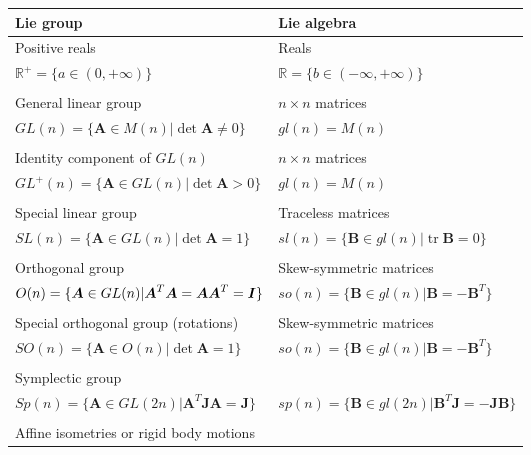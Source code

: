 \documentclass[12pt]{article}
\newcommand{\mbs}[1]{\boldsymbol{#1}}
\newcommand{\mbb}[1]{\mathbb{#1}}
\def\bA{{\mbs{A}}} \def\bB{{\mbs{B}}} \def\bC{{\mbs{C}}}
\def\bJ{{\mbs{J}}} \def\bK{{\mbs{K}}} \def\bL{{\mbs{L}}}
\DeclareMathOperator{\tr}{tr}
\begin{document}
\begin{table}[htbp]
  \begin{center}
    \begin{tabular}{ l l }
      \toprule
      Lie group
      &
      Lie algebra
      \\
      \hline
      Positive reals
      &
      Reals
      \\
      $\mbb{R}^+ = \{ a \in (0,+\infty) \}$
      &
      $\mbb{R} = \{ b \in (-\infty, +\infty) \}$
      \\
      \\
      General linear group
      &
      $n\times n$ matrices
      \\
      $GL(n)=\{\bA\in M(n) | \det \bA \neq 0\}$
      &
      $gl(n)=M(n)$
      \\
      \\
      Identity component of $GL(n)$
      &
      $n\times n$ matrices
      \\
      $GL^+(n)=\{\bA\in GL(n) | \det \bA > 0\}$
      &
      $gl(n)=M(n)$
      \\
      \\
      Special linear group
      &
      Traceless matrices
      \\
      $SL(n)=\{\bA\in GL(n) | \det \bA = 1\}$
      &
      $sl(n)=\{\bB\in gl(n) | \tr \bB = 0\}$
      \\
      \\
      Orthogonal group
      &
      Skew-symmetric matrices
      \\
      $O(n)=\{\bA\in GL(n) | \bA^T\bA = \bA\bA^T = \bI\}$
      &
      $so(n)=\{\bB\in gl(n) | \bB = -\bB^T\}$
      \\
      \\
      Special orthogonal group (rotations)
      &
      Skew-symmetric matrices
      \\
      $SO(n)=\{\bA\in O(n) | \det \bA=1\}$
      &
      $so(n)=\{\bB\in gl(n) | \bB = -\bB^T\}$
      \\
      \\
      Symplectic group
      &
      
      \\
      $Sp(n)=\{\bA\in GL(2n) | \bA^T \bJ\bA = \bJ\}$
      &
      $sp(n)=\{\bB\in gl(2n) | \bB^T \bJ = -\bJ \bB\}$
      \\
      \\
      Affine isometries or rigid body motions
      &
      

\end{tabular}
\end{center}
\end{table}
\end{document}
